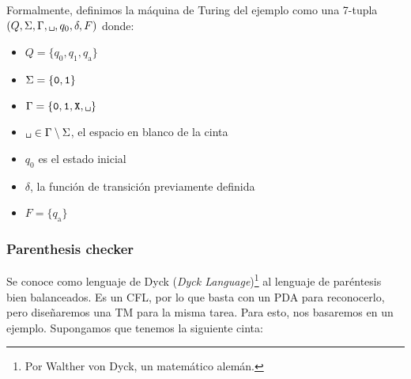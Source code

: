 \documentclass{article}
\newcommand{\blank}{\text{\tt \textvisiblespace}}
\theoremstyle{definition}
\begin{document}
Formalmente, definimos la máquina de Turing del ejemplo como una 7-tupla $(Q,
\Sigma, \Gamma, \blank, q_0, \delta, F)$ donde:
\begin{multicols}{2}
\raggedcolumns%
\begin{itemize}
  \setlength\itemsep{0pt}
   \item $Q = \{q_0, q_1, q_{\text{a}}\}$
   \item $\Sigma = \{{\tt 0,1}\}$
   \item $\Gamma = \{{\tt 0,1, X, \blank}\}$
   \item $\blank \in \Gamma \setminus \Sigma$, el espacio en
     blanco de la cinta
   \item $q_0$ es el estado inicial
   \item $\delta$, la función de transición previamente definida
   \item $F = \{ q_{\text{a}} \}$
 \end{itemize}
\end{multicols}

\subsubsection*{Parenthesis checker}

Se conoce como lenguaje de Dyck (\textit{Dyck Language})\footnote{Por Walther
von Dyck, un matemático alemán.} al lenguaje de
paréntesis bien balanceados. Es un CFL, por lo que basta con un PDA para
reconocerlo, pero diseñaremos una TM para la misma tarea. Para esto, nos
basaremos en un ejemplo. Supongamos que tenemos la siguiente cinta:

\begin{center}
\end{center}
\end{document}
